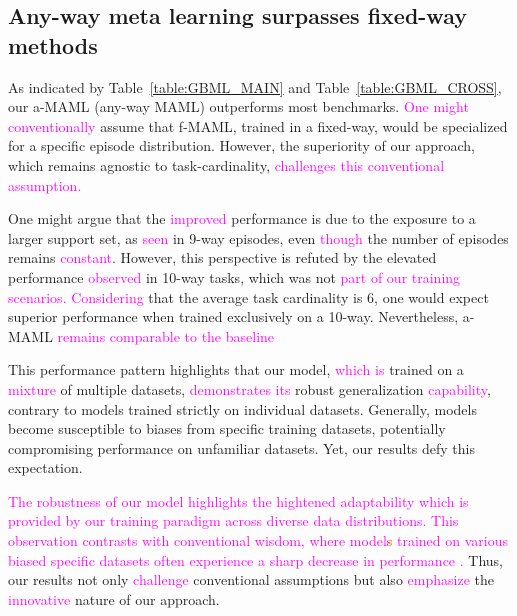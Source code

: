 \documentclass[letterpaper]{article} %
\newcommand{\nj}[1]{\textcolor{red}{#1}}
\newcommand{\yr}[1]{\textcolor{magenta}{#1}}
\begin{document}
{\subsection{Any-way meta learning surpasses fixed-way methods}
As indicated by Table~\ref{table:GBML_MAIN} and Table~\ref{table:GBML_CROSS}, our a-MAML (any-way MAML) outperforms most benchmarks. \yr{One might conventionally} assume that f-MAML, trained in a fixed-way, would be specialized for a specific episode distribution. However, the superiority of our approach, which remains agnostic to task-cardinality, \yr{challenges this conventional assumption.}

One might argue that the \yr{improved} performance is due to the exposure to a larger support set, as \yr{seen} in 9-way episodes, even \yr{though} the number of episodes remains \yr{constant}. However, this perspective is refuted by the elevated performance \yr{observed} in 10-way tasks, which was not \yr{part of our training scenarios.}
\yr{Considering} that the average task cardinality is 6, one would expect superior performance when trained exclusively on a 10-way. Nevertheless, a-MAML \yr{remains comparable to the baseline} %

This performance pattern highlights that our model, \yr{which is} trained on a \yr{mixture} of multiple datasets, \yr{demonstrates its} robust generalization \yr{capability}, contrary to models trained strictly on individual datasets. Generally, models become susceptible to biases from specific training datasets, potentially compromising performance on unfamiliar datasets. Yet, our results defy this expectation.

\yr{The robustness of our model highlights the hightened adaptability which is provided by our training paradigm across diverse data distributions. This observation contrasts with conventional wisdom, where model\nj{s} trained on various biased specific datasets often experience a sharp decrease in performance \cite{theory:specificdataset}.} %
Thus, our results not only \yr{challenge} conventional assumptions but also \yr{emphasize} the \yr{innovative} %
nature of our approach.

}
\end{document}
